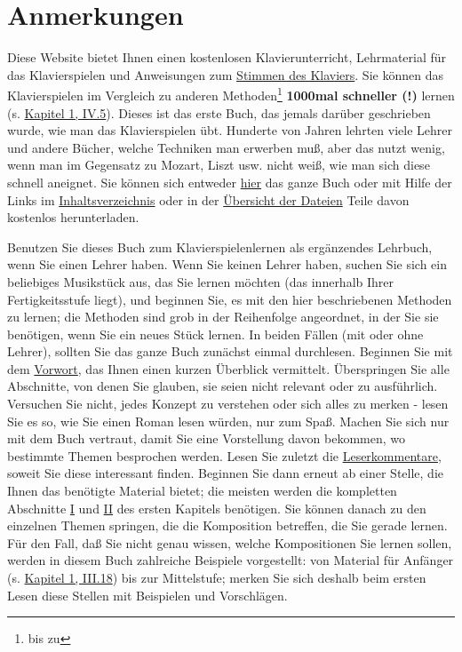 
\chapter{Anmerkungen}
\label{anmerkungen}

Diese Website bietet Ihnen einen kostenlosen Klavierunterricht, Lehrmaterial für das Klavierspielen und Anweisungen zum \hyperref[c2_1]{Stimmen des Klaviers}.
Sie können das Klavierspielen im Vergleich zu anderen Methoden\footnote{bis zu} \textbf{1000mal schneller (!)} lernen (s. \hyperref[c1iv5]{Kapitel 1, IV.5}).
Dieses ist das erste Buch, das jemals darüber geschrieben wurde, wie man das Klavierspielen übt.
Hunderte von Jahren lehrten viele Lehrer und andere Bücher, welche Techniken man erwerben muß, aber das nutzt wenig, wenn man im Gegensatz zu Mozart, Liszt usw. nicht weiß, wie man sich diese schnell aneignet.
Sie können sich entweder \hyperref[copy]{hier} das ganze Buch oder mit Hilfe der Links im \hyperref[Inhalt]{Inhaltsverzeichnis} oder in der \href{http://foppde.uteedgar\-lins.de/foppde.html\#copy}{Übersicht der Dateien} Teile davon kostenlos herunterladen.

Benutzen Sie dieses Buch zum Klavierspielenlernen als ergänzendes Lehrbuch, wenn Sie einen Lehrer haben.
Wenn Sie keinen Lehrer haben, suchen Sie sich ein beliebiges Musikstück aus, das Sie lernen möchten (das innerhalb Ihrer Fertigkeitsstufe liegt), und beginnen Sie, es mit den hier beschriebenen Methoden zu lernen; die Methoden sind grob in der Reihenfolge angeordnet, in der Sie sie benötigen, wenn Sie ein neues Stück lernen.
In beiden Fällen (mit oder ohne Lehrer), sollten Sie das ganze Buch zunächst einmal durchlesen.
Beginnen Sie mit dem \hyperref[preface]{Vorwort}, das Ihnen einen kurzen Überblick vermittelt.
Überspringen Sie alle Abschnitte, von denen Sie glauben, sie seien nicht relevant oder zu ausführlich.
Versuchen Sie nicht, jedes Konzept zu verstehen oder sich alles zu merken - lesen Sie es so, wie Sie einen Roman lesen würden, nur zum Spaß.
Machen Sie sich nur mit dem Buch vertraut, damit Sie eine Vorstellung davon bekommen, wo bestimmte Themen besprochen werden.
Lesen Sie zuletzt die \hyperref[testimonials]{Leserkommentare}, soweit Sie diese interessant finden.
Beginnen Sie dann erneut ab einer Stelle, die Ihnen das benötigte Material bietet; die meisten werden die kompletten Abschnitte \hyperref[c1i1]{I} und \hyperref[c1ii1]{II} des ersten Kapitels benötigen.
Sie können danach zu den einzelnen Themen springen, die die Komposition betreffen, die Sie gerade lernen.
Für den Fall, daß Sie nicht genau wissen, welche Kompositionen Sie lernen sollen, werden in diesem Buch zahlreiche Beispiele vorgestellt: von Material für Anfänger (s. \hyperref[c1iii18]{Kapitel 1, III.18}) bis zur Mittelstufe; merken Sie sich deshalb beim ersten Lesen diese Stellen mit Beispielen und Vorschlägen.

